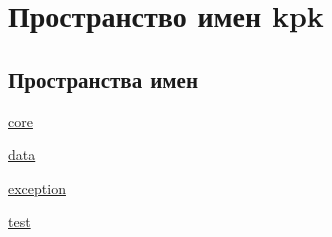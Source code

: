 \hypertarget{namespacekpk}{}\section{Пространство имен kpk}
\label{namespacekpk}
\subsection*{Пространства имен}
\begin{DoxyCompactItemize}
\item 
 \hyperlink{namespacekpk_1_1core}{core}
\item 
 \hyperlink{namespacekpk_1_1data}{data}
\item 
 \hyperlink{namespacekpk_1_1exception}{exception}
\item 
 \hyperlink{namespacekpk_1_1test}{test}
\end{DoxyCompactItemize}
